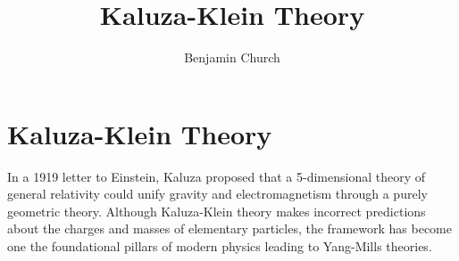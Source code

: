 \documentclass[11pt, a4paper]{article}
\begin{document}
\author{Benjamin Church}
\title{\Huge Kaluza-Klein Theory}

\newcommand{\R}{\mathbb{R}}
\renewcommand{\d}[1]{\mathrm{d}#1}
\newcommand{\dn}[2]{\mathrm{d}^{#1} #2}
\newcommand{\deriv}[2]{\frac{\d{#1}}{\d{#2}}}
\newcommand{\pderiv}[2]{\frac{\partial{#1}}{\partial{#2}}}
\newcommand{\nderiv}[3]{\frac{\d{^{#1} #2}}{\d{#3}^{#1}}}
\newcommand{\cderiv}[3]{\left(\frac{\partial{#1}}{\partial{#2}}\right)_{#3}}
\newcommand{\cobase}[1]{\vec{e}^{\, #1}}

\theoremstyle{theorem}
\newtheorem{theorem}{Theorem}[section]
\newtheorem{lemma}[theorem]{Lemma}
\newtheorem{corollary}[theorem]{Corollary}

\theoremstyle{definition}
\newtheorem*{problem}{Problem}

\theoremstyle{definition}
\newtheorem{example}{Example}[section]

\theoremstyle{definition}
\newtheorem{definition}{Definition}[section]

\theoremstyle{remark}
\newtheorem{remark}{Remark}[subsection]


\maketitle
\tableofcontents
\newpage


\section{Kaluza-Klein Theory}

In a 1919 letter to Einstein, Kaluza proposed that a 5-dimensional theory of general relativity could unify gravity and electromagnetism through a purely geometric theory. Although Kaluza-Klein theory makes incorrect predictions about the charges and masses of elementary particles, the framework has become one the foundational pillars of modern physics leading to Yang-Mills theories. 
\end{document}
